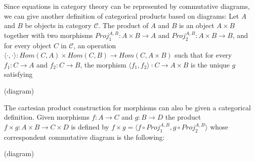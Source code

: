 Since equations in category theory can be represented by commutative diagrams, we can give another definition of categorical products based on diagrams: Let $ A $ and $ B $ be objects in category $ \mathcal{C} $. The product of $ A $ and $ B $ is an object $ A \times B $ together with two morphisms $ Proj_1^{A,B}: A \times B \to A $ and $ Proj_2^{A,B}: A \times B \to B $, and for every object $ C $ in $ \mathcal{C} $, an operation $ \langle \cdot , \cdot \rangle : Hom(C,A) \times Hom(C,B) \to Hom(C, A \times B) $ such that for every $ f_1 : C \to A $ and $ f_2 : C \to B $, the morphism $ \langle f_1 , f_2 \rangle ∶ C \to A \times B $ is the unique $ g $ satisfying

(diagram)

The cartesian product construction for morphisms can also be given a categorical definition. Given morphisms $ f : A \to C $ and $ g : B \to D $ the product $ f \times g : A \times B \to C \times D $ is defined by $ f \times g = \langle f \circ Proj_1^{A,B} , g \circ Proj_2^{A,B} \rangle $ whose correspondent commutative diagram is the following:

(diagram)

